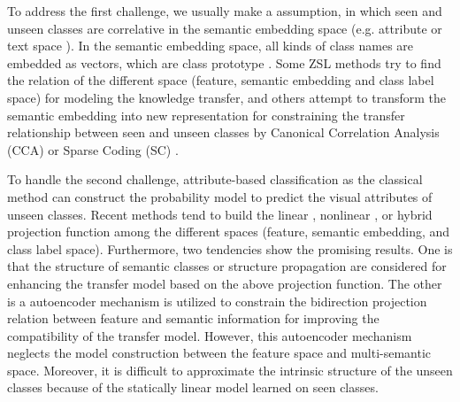 \documentclass[review]{elsarticle}
\begin{document}
To address the first challenge, we usually make a assumption, in which seen and unseen classes are correlative in the semantic embedding space (e.g. attribute \cite{farhadi2009describing} \cite{lampert2009learning} \cite{parikh2011relative} or text space \cite{Frome2013DeViSE} \cite{mikolov2013efficient} \cite{Socher2013Zero}). In the semantic embedding space, all kinds of class names are embedded as vectors, which are class prototype \cite{Fu2014Transductive}. Some ZSL methods \cite{Fu2014Transductive} \cite{jayaraman2014zero} \cite{Lampert2014} \cite{li2015semi} \cite{li2014attributes} \cite{norouzi2013zero} \cite{romera2015embarrassingly} try to find the relation of the different space (feature, semantic embedding and class label space) for modeling the knowledge transfer, and others attempt to transform the semantic embedding into new representation for constraining the transfer relationship between seen and unseen classes by Canonical Correlation Analysis (CCA)\cite{Fu2015Transductive} or Sparse Coding (SC) \cite{yu2017transductive} \cite{zhang2015zero}.

To handle the second challenge, attribute-based classification \cite{Lampert2014} as the classical method can construct the probability model to predict the visual attributes of unseen classes. Recent methods tend to build the linear \cite{Frome2013DeViSE} \cite{7298911} \cite{Akata2016Label} \cite{Kodirov2017}, nonlinear \cite{Socher2013Zero} \cite{7780384}, or hybrid \cite{norouzi2013zero} \cite{zhang2015zero} projection function among the different spaces (feature, semantic embedding, and class label space). Furthermore, two tendencies show the promising results. One is that the structure of semantic classes \cite{Changpinyo2016} or structure propagation \cite{Lin2018structure} are considered for enhancing the transfer model based on the above projection function. The other is a autoencoder mechanism is utilized to constrain the bidirection projection relation between feature and semantic information for improving the compatibility of the transfer model\cite{Kodirov2017}. However, this autoencoder mechanism neglects the model construction between the feature space and multi-semantic space. Moreover, it is difficult to approximate the intrinsic structure of the unseen classes because of the statically linear model learned on seen classes.
\end{document}
